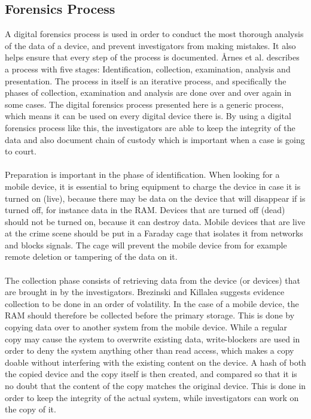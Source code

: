 \subsection{Forensics Process}
A digital forensics process is used in order to conduct the most thorough analysis of the data of a device, and prevent investigators from making mistakes. It also helps ensure that every step of the process is documented. \r{A}rnes et al. describes a process with five stages: Identification, collection, examination, analysis and presentation\cite{DiFoBook}. The process in itself is an iterative process, and specifically the phases of collection, examination and analysis are done over and over again in some cases. The digital forensics process presented here is a generic process, which means it can be used on every digital device there is. By using a digital forensics process like this, the investigators are able to keep the integrity of the data and also document chain of custody which is important when a case is going to court.\\
\\
Preparation is important in the phase of identification. When looking for a mobile device, it is essential to bring equipment to charge the device in case it is turned on (live), because there may be data on the device that will disappear if is turned off, for instance data in the RAM. Devices that are turned off (dead) should not be turned on, because it can destroy data. Mobile devices that are live at the crime scene should be put in a Faraday cage that isolates it from networks and blocks signals. The cage will prevent the mobile device from for example remote deletion or tampering of the data on it\cite{DiFoBook}.\\
\\
The collection phase consists of retrieving data from the device (or devices) that are brought in by the investigators\cite{DiFoBook}. Brezinski and Killalea\cite{RFC3227} suggests evidence collection to be done in an order of volatility. In the case of a mobile device, the RAM should therefore be collected before the primary storage. This is done by copying data over to another system from the mobile device. While a regular copy may cause the system to overwrite existing data, write-blockers are used in order to deny the system anything other than read access, which makes a copy doable without interfering with the existing content on the device. A hash of both the copied device and the copy itself is then created, and compared so that it is no doubt that the content of the copy matches the original device\cite{DiFoBook}. This is done in order to keep the integrity of the actual system, while investigators can work on the copy of it.\\ %
